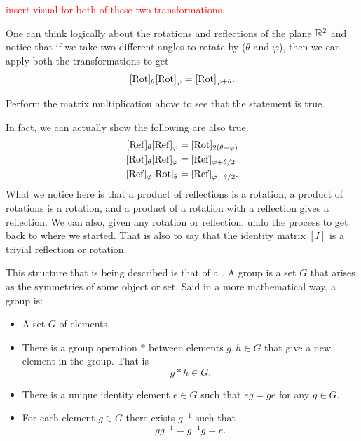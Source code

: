             \textcolor{red}{insert visual for both of these two transformations.}
            
            One can think logically about the rotations and reflections of the plane $\mathbb{R}^2$ and notice that if we take two different angles to rotate by ($\theta$ and $\varphi$), then we can apply both the transformations to get
            \[
            [\mathrm{Rot}]_\theta [\mathrm{Rot}]_\varphi = [\mathrm{Rot}]_{\varphi + \theta}.
            \]
            
            \begin{exercise}
                Perform the matrix multiplication above to see that the statement is true.
            \end{exercise}
            
            \noindent In fact, we can actually show the following are also true.
            \begin{align*}
                \Ref_\theta \Ref_\varphi &= \Rot_{2(\theta-\varphi)}\\
                \Rot_\theta \Ref_\varphi &= \Ref_{\varphi + \theta/2}\\
                \Ref_\varphi \Rot_\theta &= \Ref_{\varphi - \theta/2}.
            \end{align*}
            What we notice here is that a product of reflections is a rotation, a product of rotations is a rotation, and a product of a rotation with a reflection gives a reflection.  We can also, given any rotation or reflection, undo the process to get back to where we started.  That is also to say that the identity matrix $[I]$ is a trivial reflection or rotation.  
            
            This structure that is being described is that of a .  A group is a set $G$ that arises as the symmetries of some object or set.  Said in a more mathematical way, a group is:
            \begin{itemize}
                \item A set $G$ of elements.
                \item There is a group operation $\ast$ between elements $g,h\in G$ that give a new element in the group. That is
                \[
                g\ast h \in G.
                \]
                \item There is a unique identity element $e\in G$ such that $eg=ge$ for any $g\in G$.
                \item For each element $g\in G$ there exists $g^{-1}$ such that
                \[
                gg^{-1} = g^{-1}g=e.
                \]
            \end{itemize}
            
